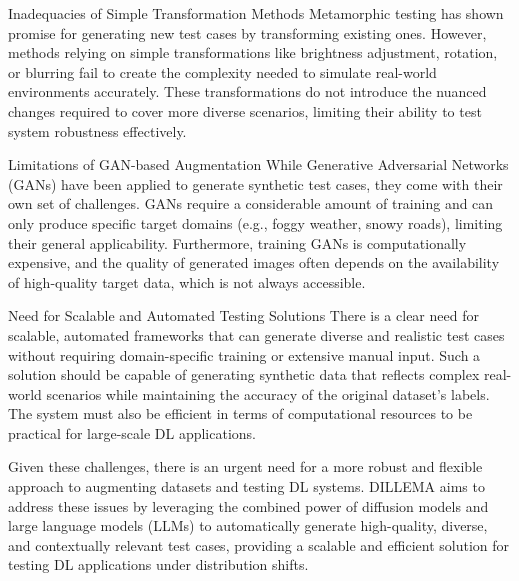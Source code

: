 Inadequacies of Simple Transformation Methods
Metamorphic testing has shown promise for generating new test cases by transforming existing ones. However, methods relying on simple transformations like brightness adjustment, rotation, or blurring fail to create the complexity needed to simulate real-world environments accurately. These transformations do not introduce the nuanced changes required to cover more diverse scenarios, limiting their ability to test system robustness effectively.

Limitations of GAN-based Augmentation
While Generative Adversarial Networks (GANs) have been applied to generate synthetic test cases, they come with their own set of challenges. GANs require a considerable amount of training and can only produce specific target domains (e.g., foggy weather, snowy roads), limiting their general applicability. Furthermore, training GANs is computationally expensive, and the quality of generated images often depends on the availability of high-quality target data, which is not always accessible.

Need for Scalable and Automated Testing Solutions
There is a clear need for scalable, automated frameworks that can generate diverse and realistic test cases without requiring domain-specific training or extensive manual input. Such a solution should be capable of generating synthetic data that reflects complex real-world scenarios while maintaining the accuracy of the original dataset's labels. The system must also be efficient in terms of computational resources to be practical for large-scale DL applications.

Given these challenges, there is an urgent need for a more robust and flexible approach to augmenting datasets and testing DL systems. DILLEMA aims to address these issues by leveraging the combined power of diffusion models and large language models (LLMs) to automatically generate high-quality, diverse, and contextually relevant test cases, providing a scalable and efficient solution for testing DL applications under distribution shifts.